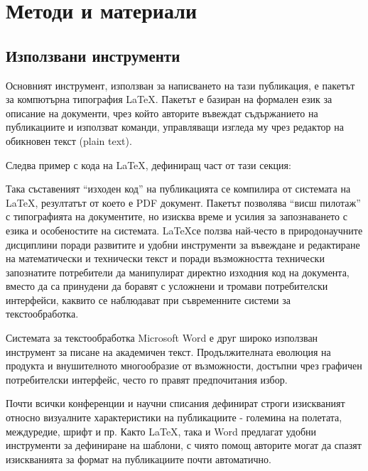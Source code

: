 \documentclass[11pt, oneside]{article}     %
\begin{document}
\section{Методи и материали}
\subsection*{Използвани инструменти}
Основният инструмент, използван за написването на тази публикация, е пакетът за компютърна типография \LaTeX \cite{latex}. Пакетът е базиран на формален език за описание на документи, чрез който авторите въвеждат съдържанието на публикациите и използват команди, управляващи изгледа му чрез редактор на обикновен текст (plain text).

 Следва пример с кода на \LaTeX, дефиниращ част от тази секция:


 Така съставеният ``изходен код'' на публикацията се компилира от системата на \LaTeX, резултатът от което е PDF документ. Пакетът позволява ``висш пилотаж'' с типографията на документите, но изисква време и усилия за запознаването с езика и особеностите на системата. \LaTeX се ползва най-често в природонаучните дисциплини поради развитите и удобни инструменти за въвеждане и редактиране на математически и технически текст и поради възможността технически запознатите потребители да манипулират директно изходния код на документа, вместо да са принудени да боравят с усложнени и тромави потребителски интерфейси, каквито се наблюдават при съвременните системи за текстообработка.

Системата за текстообработка Microsoft Word е друг широко използван инструмент за писане на академичен текст. Продължителната еволюция на продукта и внушителното многообразие от възможности, достъпни чрез графичен потребителски интерфейс, често го правят предпочитания избор.

Почти всички конференции и научни списания дефинират строги изискваният относно визуалните характеристики на публикациите - големина на полетата, междуредие, шрифт и пр. Както \LaTeX, така и Word предлагат удобни инструменти за дефиниране на шаблони, с чиято помощ авторите могат да спазят изискванията за формат на публикациите почти автоматично.
\end{document}
